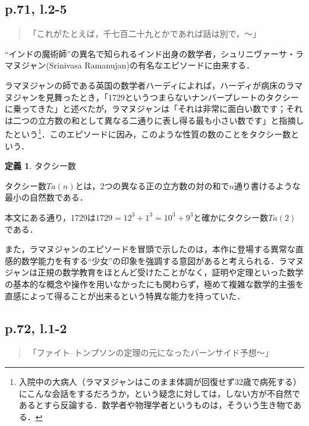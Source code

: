 \documentclass[10pt, a5paper, twoside]{jsarticle}
\theoremstyle{definition}
\newtheorem{dfn}{定義}
\begin{document}
		\subsection{p.71, l.2-5}

			\begin{quote}
				
				「これがたとえば，千七百二十九とかであれば話は別で，〜」

			\end{quote}

			“インドの魔術師”の異名で知られるインド出身の数学者，シュリニヴァーサ・ラマヌジャン(Srinivasa Ramanujan)の有名なエピソードに由来する．

			ラマヌジャンの師である英国の数学者ハーディによれば，ハーディが病床のラマヌジャンを見舞ったとき，「1729というつまらないナンバープレートのタクシーに乗ってきた」と述べたが，ラマヌジャンは「それは非常に面白い数です；それは二つの立方数の和として異なる二通りに表し得る最も小さい数です」と指摘したという\cite{ram}\footnote{入院中の大病人（ラマヌジャンはこのまま体調が回復せず32歳で病死する）にこんな会話をするだろうか，という疑念に対しては，しない方が不自然であるとすら反論する．数学者や物理学者というものは，そういう生き物である．}．このエピソードに因み，このような性質の数のことをタクシー数という．

			\begin{dfn}

				タクシー数

				タクシー数$Ta(n)$とは，2つの異なる正の立方数の対の和で$n$通り書けるような最小の自然数である．
				
			\end{dfn}

			本文にある通り，1729は$1729 = 12^3 + 1^3 = 10^3 + 9^3$と確かにタクシー数$Ta(2)$である．

			また，ラマヌジャンのエピソードを冒頭で示したのは，本作に登場する異常な直感的数学能力を有する“少女”の印象を強調する意図があると考えられる．ラマヌジャンは正規の数学教育をほとんど受けたことがなく，証明や定理といった数学の基本的な概念や操作を用いなかったにも関わらず，極めて複雑な数学的主張を直感によって得ることが出来るという特異な能力を持っていた．

		\subsection{p.72, l.1-2}
		
			\begin{quote}
				
				「ファイト--トンプソンの定理の元になったバーンサイド予想〜」

			\end{quote}
\end{document}
